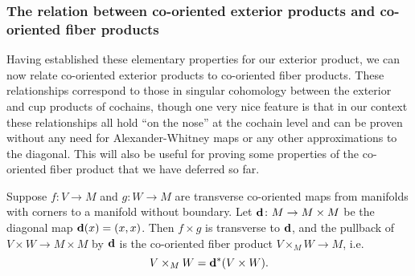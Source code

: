 \subsubsection{The relation between co-oriented exterior products and co-oriented fiber products}\label{S: product relations}

Having established these elementary properties for our exterior product, we can now relate co-oriented exterior products to co-oriented fiber products.
These relationships correspond to those in singular cohomology between the exterior and cup products of cochains, though one very nice feature is that in our context these relationships all hold ``on the nose'' at the cochain level and can be proven without any need for Alexander-Whitney maps or any other approximations to the diagonal.
This will also be useful for proving some properties of the co-oriented fiber product that we have deferred so far.

\begin{proposition}\label{P: cross to cup}
	Suppose $f \colon V \to M$ and $g \colon W \to M$ are transverse co-oriented maps from manifolds with corners to a manifold without boundary.
	Let $\mathbf{d} \colon M \to M \times M$ be the diagonal map $\mathbf{d}(x) = (x,x)$.
	Then $f \times g$ is transverse to $\mathbf{d}$, and the pullback of $V \times W \to M \times M$ by $\mathbf{d}$ is the co-oriented fiber product $V \times_M W \to M$, i.e.\ $$V \times_M W = \mathbf{d}^*(V \times W).$$
\end{proposition}

